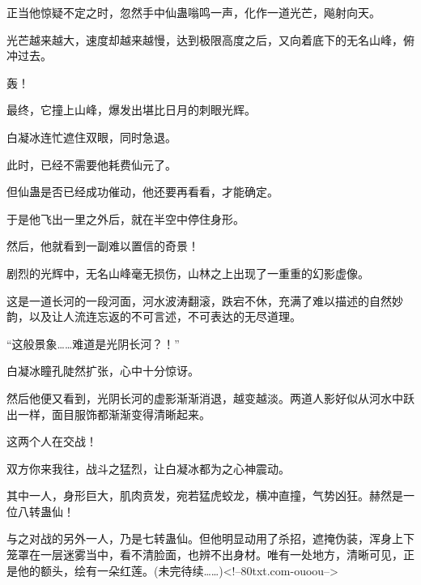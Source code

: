\begin{this_body}
正当他惊疑不定之时，忽然手中仙蛊嗡鸣一声，化作一道光芒，飚射向天。

光芒越来越大，速度却越来越慢，达到极限高度之后，又向着底下的无名山峰，俯冲过去。

轰！

最终，它撞上山峰，爆发出堪比日月的刺眼光辉。

白凝冰连忙遮住双眼，同时急退。

此时，已经不需要他耗费仙元了。

但仙蛊是否已经成功催动，他还要再看看，才能确定。

于是他飞出一里之外后，就在半空中停住身形。

然后，他就看到一副难以置信的奇景！

剧烈的光辉中，无名山峰毫无损伤，山林之上出现了一重重的幻影虚像。

这是一道长河的一段河面，河水波涛翻滚，跌宕不休，充满了难以描述的自然妙韵，以及让人流连忘返的不可言述，不可表达的无尽道理。

“这般景象……难道是光阴长河？！”

白凝冰瞳孔陡然扩张，心中十分惊讶。

然后他便又看到，光阴长河的虚影渐渐消退，越变越淡。两道人影好似从河水中跃出一样，面目服饰都渐渐变得清晰起来。

这两个人在交战！

双方你来我往，战斗之猛烈，让白凝冰都为之心神震动。

其中一人，身形巨大，肌肉贲发，宛若猛虎蛟龙，横冲直撞，气势凶狂。赫然是一位八转蛊仙！

与之对战的另外一人，乃是七转蛊仙。但他明显动用了杀招，遮掩伪装，浑身上下笼罩在一层迷雾当中，看不清脸面，也辨不出身材。唯有一处地方，清晰可见，正是他的额头，绘有一朵红莲。(未完待续……)<!--80txt.com-ouoou-->

\end{this_body}

